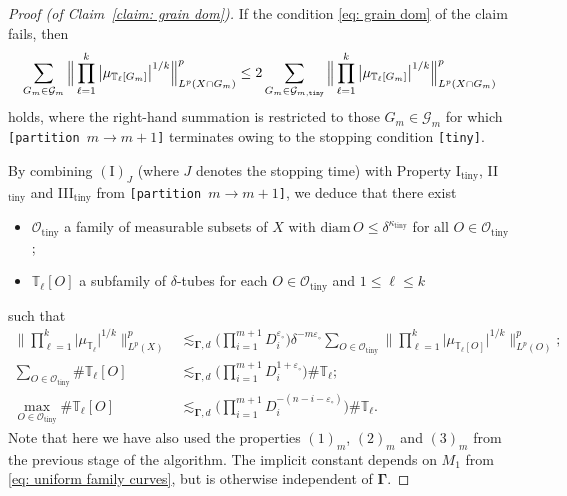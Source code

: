 \documentclass[reqno]{amsart}
\numberwithin{equation}{section}
\newcommand{\T}{\mathbb{T}}
\newcommand{\cG}{\mathcal{G}}
\newcommand{\cO}{\mathcal{O}}
\newcommand{\bdGamma}{\boldsymbol{\Gamma}}
\theoremstyle{plain}
\theoremstyle{definition}
\newcommand{\ttiny}{\mathrm{tiny}}
\newcommand{\diam}{\mathrm{diam}}
\begin{document}
\begin{proof}[Proof (of Claim~\ref{claim: grain dom})] If the condition \eqref{eq: grain dom} of the claim fails, then 
  \begin{equation*}
      \sum_{G_m \in \cG_m} \Big\|\prod_{\ell = 1}^k\big|\mu_{\T_{\ell}[G_m]} \big|^{1/k}\Big\|_{L^p(X \cap G_m)}^p \leq 2 \sum_{G_m \in \cG_{m,\textrm{\texttt{tiny}}}}  \Big\|\prod_{\ell = 1}^k\big|\mu_{\T_{\ell}[G_m]} \big|^{1/k} \Big\|_{L^p(X \cap G_m)}^p
\end{equation*}
holds, where the right-hand summation is restricted to those $G_m \in \cG_m$ for which \texttt{[partition $m \to m+1$]} terminates owing to the stopping condition \texttt{[tiny]}.  

By combining $(\mathrm{I})_J$ (where $J$ denotes the stopping time) with Property I$_{\ttiny}$, II$_{\ttiny}$ and III$_{\ttiny}$ from \texttt{[partition $m \to m+1$]}, we deduce that there exist
\begin{itemize}
    \item $\cO_{\ttiny}$ a family of measurable subsets of $X$ with $\diam\,O \leq \delta^{\kappa_{\ttiny}}$ for all $O \in \cO_{\ttiny}$;
    \item $\T_{\ell}[O]$ a subfamily of $\delta$-tubes for each $O \in \cO_{\ttiny}$ and $1 \leq \ell \leq k$
\end{itemize}
such that
\begin{align}\label{eq: tiny endgame 1}
    \Big\|\prod_{\ell = 1}^k \big| \mu_{\T_{\ell}} \big|^{1/k} \Big\|_{L^p(X)}^p &\lesssim_{\bdGamma, d} \Big(\prod_{i = 1}^{m+1} D_i^{\varepsilon_{\circ}} \Big)\delta^{-m\varepsilon_{\circ}} \sum_{O \in \cO_{\ttiny}} \Big\|\prod_{\ell = 1}^k \big| \mu_{\T_{\ell}[O]}  \big|^{1/k}\Big\|_{L^p(O)}^p; \\
\label{eq: tiny endgame 2}
        \sum_{O \in \cO_{\ttiny}} \#\T_{\ell}[O] &\lesssim_{\bdGamma, d} \Big(\prod_{i = 1}^{m+1} D_i^{1 + \varepsilon_{\circ}} \Big)\#\T_{\ell};\\
\label{eq: tiny endgame 2.5}        
        \max_{O \in \cO_{\ttiny}} \#\T_{\ell}[O] &\lesssim_{\bdGamma, d} \Big(\prod_{i = 1}^{m+1} D_i^{-(n - i - \varepsilon_{\circ})} \Big) \#\T_{\ell}.
\end{align}
Note that here we have also used the properties $(1)_m$, $(2)_m$ and $(3)_m$ from the previous stage of the algorithm. The implicit constant depends on $M_1$ from \eqref{eq: uniform family curves}, but is otherwise independent of $\bdGamma$. 


\end{proof}
\end{document}
